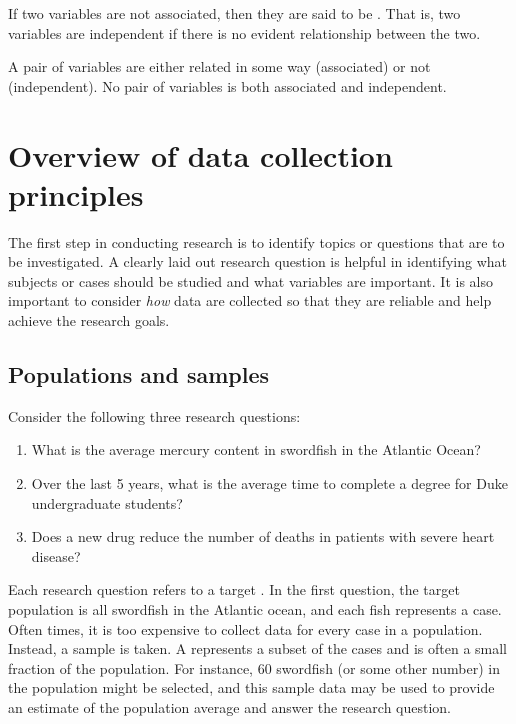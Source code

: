 If two variables are not associated, then they are said to be . That is, two variables are independent if there is no evident relationship between the two.

\begin{termBox}{
A pair of variables are either related in some way (associated) or not (independent). No pair of variables is both associated and independent.}
\end{termBox}




\textA{\newpage}

\section[Overview of data collection principles]{Overview of data collection principles }
\label{overviewOfDataCollectionPrinciples}


The first step in conducting research is to identify topics or questions that are to be investigated. A clearly laid out research question is helpful in identifying what subjects or cases should be studied and what variables are important. It is also important to consider \emph{how} data are collected so that they are reliable and help achieve the research goals.

\subsection{Populations and samples}
\label{populationsAndSamples}

Consider the following three research questions:
\begin{enumerate}
\setlength{\itemsep}{0mm}
\item What is the average mercury content in swordfish in the Atlantic Ocean?
\item\label{timeToGraduationQuestionForUCLAStudents} Over the last 5 years, what is the average time to complete a degree for Duke undergraduate students?
\item\label{identifyPopulationOfStentStudy} Does a new drug reduce the number of deaths in patients with severe heart disease?
\end{enumerate}
Each research question refers to a target . In the first question, the target population is all swordfish in the Atlantic ocean, and each fish represents a case. Often times, it is too expensive to collect data for every case in a population. Instead, a sample is taken. A  represents a subset of the cases and is often a small fraction of the population. For instance, 60 swordfish (or some other number) in the population might be selected, and this sample data may be used to provide an estimate of the population average and answer the research question.

